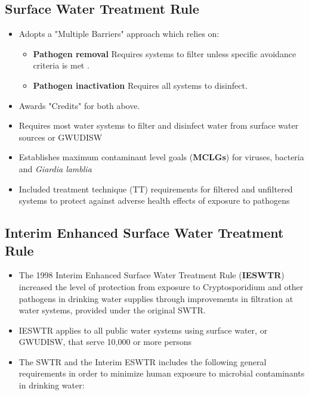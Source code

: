 \subsection{Surface Water Treatment Rule}
\begin{itemize}
\item Adopts a "Multiple Barriers" approach which relies on:
\begin{itemize}
\item \textbf{Pathogen removal} Requires systems to filter unless specific avoidance criteria is met .  
\item \textbf{Pathogen inactivation}  Requires all systems to disinfect.
\end{itemize}
\item Awards "Credits" for both above. 
\item Requires most water systems to filter and disinfect water from surface water sources or GWUDISW
\item Establishes maximum contaminant level goals (\textbf{MCLGs}) for viruses, bacteria and \textit{Giardia lamblia}
\item Included treatment technique (TT) requirements for filtered and unfiltered systems to protect against adverse health effects of exposure to pathogens


\end{itemize}

\subsection{Interim Enhanced Surface Water Treatment Rule}
\begin{itemize}
\item The 1998 Interim Enhanced Surface Water Treatment Rule (\textbf{IESWTR}) increased the level of protection from exposure to Cryptosporidium and other pathogens in drinking water supplies through improvements in filtration at water systems, provided under the original SWTR.
\item IESWTR applies to all public water systems using surface water, or GWUDISW, that serve 10,000 or more persons
\item The SWTR and the Interim ESWTR includes the following general requirements in order to minimize human exposure to microbial contaminants in drinking water:
\end{itemize}

